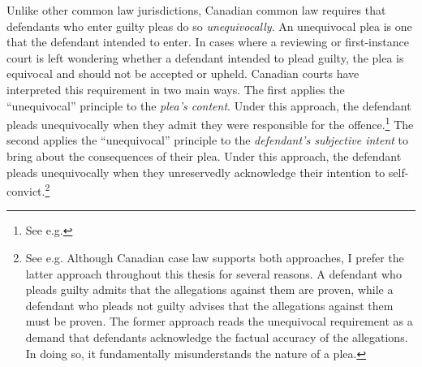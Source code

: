 Unlike other common law jurisdictions, Canadian common law requires that defendants who enter guilty pleas do so \textit{unequivocally}. An unequivocal plea is one that the defendant intended to enter. In cases where a reviewing or first-instance court is left wondering whether a defendant intended to plead guilty, the plea is equivocal and should not be accepted or upheld. Canadian courts have interpreted this requirement in two main ways. The first applies the ``unequivocal'' principle to the \textit{plea's content}. Under this approach, the defendant pleads unequivocally when they admit they were responsible for the offence.\footnote{See e.g. } The second applies the ``unequivocal'' principle to the \textit{defendant's subjective intent} to bring about the consequences of their plea. Under this approach, the defendant pleads unequivocally when they unreservedly acknowledge their intention to self-convict.\footnote{See e.g. Although Canadian case law supports both approaches, I prefer the latter approach throughout this thesis for several reasons. A defendant who pleads guilty admits that the allegations against them are proven, while a defendant who pleads not guilty advises that the allegations against them must be proven. The former approach reads the unequivocal requirement as a demand that defendants acknowledge the factual accuracy of the allegations. In doing so, it fundamentally misunderstands the nature of a plea.} 

